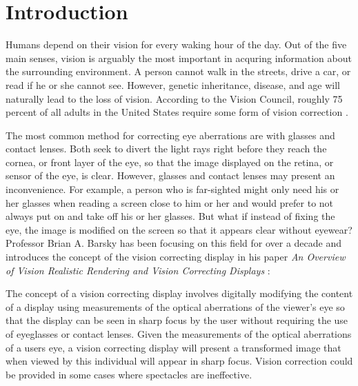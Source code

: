 \chapter{Introduction}

Humans depend on their vision for every waking hour of the day. Out of the five main senses, vision is arguably the most important in acquring information about the surrounding environment. A person cannot walk in the streets, drive a car, or read if he or she cannot see. However, genetic inheritance, disease, and age will naturally lead to the loss of vision. According to the Vision Council, roughly 75 percent of all adults in the United States require some form of vision correction \cite{GlassesCrafter.com:2010:Vision}. 

The most common method for correcting eye aberrations are with glasses and contact lenses. Both seek to divert the light rays right before they reach the cornea, or front layer of the eye, so that the image displayed on the retina, or sensor of the eye, is clear. However, glasses and contact lenses may present an inconvenience. For example, a person who is far-sighted might only need his or her glasses when reading a screen close to him or her and would prefer to not always put on and take off his or her glasses. But what if instead of fixing the eye, the image is modified on the screen so that it appears clear without eyewear? Professor Brian A. Barsky has been focusing on this field for over a decade and introduces the concept of the vision correcting display in his paper \textit{An Overview of Vision Realistic Rendering and Vision Correcting Displays} \cite{SDTP:SDTP10326}:

\begin{displayquote}
The concept of a vision correcting display involves digitally modifying the content of a display using measurements of the optical aberrations of the viewer's eye so that the display can be seen in sharp focus by the user without requiring the use of eyeglasses or contact lenses. Given the measurements of the optical aberrations of a users eye, a vision correcting display will present a transformed image that when viewed by this individual will appear in sharp focus. Vision correction could be provided in some cases where spectacles are ineffective.
\end{displayquote}



